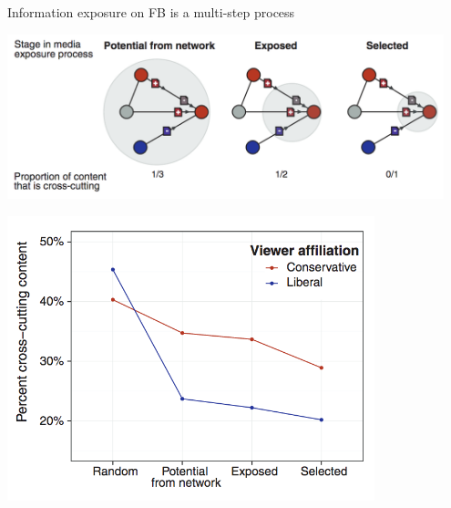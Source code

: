 \documentclass[aspectratio=169]{beamer}
\begin{document}
\begin{frame} 

Information exposure on FB is a multi-step process
\begin{center}
\includegraphics[width=0.95\textwidth]{figures/bakshy_exposure_2015_fig3a}
\end{center}

\end{frame}
\begin{frame} 

\begin{center}
\includegraphics[width=0.8\textwidth]{figures/bakshy_exposure_2015_fig3b}
\end{center}

\end{frame}
%
\end{document}
